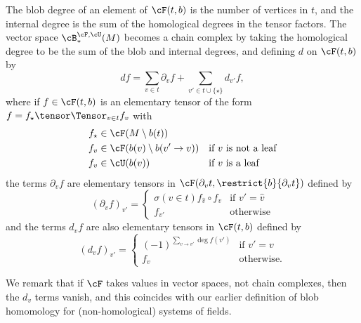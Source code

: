 The blob degree of an element of $\cF(t,b)$ is the number of vertices in $t$, and the internal degree is the sum of the homological degrees in the tensor factors.
The vector space $\cB_*^{\cF,\cU}(M)$ becomes a chain complex by taking the homological degree to be the sum of the blob and internal degrees, and defining $d$ on $\cF(t,b)$ by
\begin{equation*}
d f = \sum_{v \in t} \partial_v f + \sum_{v' \in t \cup \{\star\}} d_{v'} f,
\end{equation*}
where if $f \in \cF(t,b)$ is an elementary tensor of the form $f = f_\star \tensor \Tensor_{v \in t} f_v$ with
\begin{align*}
f_\star & \in \cF(M \setminus b(t)) && \\
f_v       & \in \cF(b(v) \setminus b(v' \to v)) && \text{if $v$ is not a leaf} \\
f_v       & \in \cU(b(v)) && \text{if $v$ is a leaf}
\end{align*}
the terms $\partial_v f$ are elementary tensors in $\cF(\partial_v t, \restrict{b}{\partial_v t})$ defined by
\begin{equation*}
(\partial_v f)_{v'} = \begin{cases} \sigma(v \in t) f_{\hat{v}} \circ f_v & \text{if $v' = \hat{v}$} \\ f_{v'} & \text{otherwise} \end{cases}
\end{equation*}
and the terms $d_v f$ are also elementary tensors in $\cF(t, b)$ defined by
\begin{equation*}
(d_v f)_{v'} = \begin{cases} (-1)^{\sum_{v \to v'} \deg f(v')} & \text{if $v'=v$} \\ f_v & \text{otherwise.} \end{cases}
\end{equation*}

We remark that if $\cF$ takes values in vector spaces, not chain complexes, then the $d_v$ terms vanish, and this coincides with our earlier definition of blob homomology for (non-homological) systems of fields.

